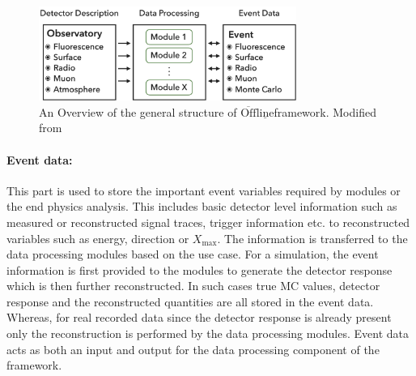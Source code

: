 \begin{figure}[t!]
  \centering
  \includegraphics[width=0.75\textwidth]{thesis_figures/Setup/Offline_schematic.png}
  \caption{An Overview of the general structure of $\mathrm{\overline{Off}\underline{line}}$framework. Modified from ~\cite{Argiro:2007qg} }
  \label{fig:Offline_schematic}
\end{figure}

\paragraph*{Event data:}
This part is used to store the important event variables required by modules or the end physics analysis. This includes basic detector level information such as measured or reconstructed signal traces, trigger information etc. to reconstructed variables such as energy, direction or $X_{\text{max}}$. The information is transferred to the data processing modules based on the use case. For a simulation, the event information is first provided to the modules to generate the detector response which is then further reconstructed. In such cases true \gls{MC} values, detector response and the reconstructed quantities are all stored in the event data. Whereas, for real recorded data since the detector response is already present only the reconstruction is performed by the data processing modules. Event data acts as both an input and output for the data processing component of the framework.

